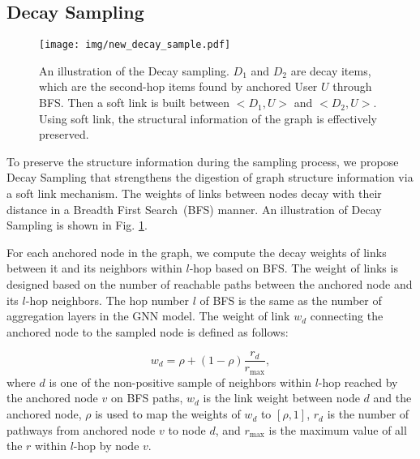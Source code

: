\subsection{\textbf{Decay Sampling}}

\begin{figure}[t]
    \centering
    
    \texttt{[image: img/new\_decay\_sample.pdf]}
    \caption{An illustration of the Decay sampling. \(D_1\) and \(D_2\) are decay items, which are the second-hop items found by anchored User \(U\) through BFS. Then a soft link is built between $<D_1,U>$ and $<D_2,U>$. Using soft link, the structural information of the graph is effectively preserved.}
    \label{fig:decay_sam}
\end{figure}


To preserve the structure information during the sampling process, we propose Decay Sampling that strengthens the digestion of graph structure information via a soft link mechanism.
The weights of links between nodes decay with their distance in a Breadth First Search~(BFS) manner.
An illustration of Decay Sampling is shown in Fig. \ref{fig:decay_sam}.


For each anchored node in the graph, we compute the decay weights of links between it and its neighbors within  \(l\)-hop based on BFS.
The weight of links is designed based on the number of reachable paths between the anchored node and its \(l\)-hop neighbors. 
The hop number \(l\) of BFS is the same as the number of aggregation layers in the GNN model. 
The weight of link \(w_d\) connecting the anchored node to the sampled node is defined as follows:

\begin{equation}\label{link}
    w_{d}=\rho+(1- \rho)\frac{r_d}{r_\text{max}},
\end{equation}
where $d$ is one of the non-positive sample of neighbors within \(l\)-hop reached by the anchored node $v$ on BFS paths, $w_{d}$ is the link weight between node $d$ and the anchored node, $\rho$ is used to map the weights of $w_{d}$ to $\left[\rho,1\right]$, $r_d$ is the number of pathways from anchored node $v$ to node $d$, and $r_\text{max}$ is the maximum value of all the \(r\) within \(l\)-hop by node $v$. 



